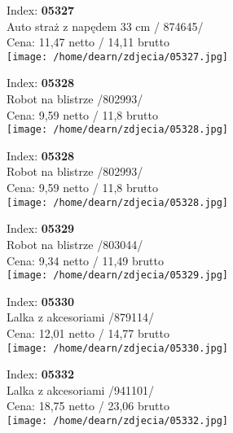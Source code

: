 {Index: \textbf{05327}\\
Auto straż z napędem 33 cm / 874645/\\
Cena: 11,47 netto / 14,11 brutto\\
  \texttt{[image: /home/dearn/zdjecia/05327.jpg]}}\newline\newline

{Index: \textbf{05328}\\
Robot na blistrze /802993/\\
Cena: 9,59 netto / 11,8 brutto\\
  \texttt{[image: /home/dearn/zdjecia/05328.jpg]}}\newline\newline

{Index: \textbf{05328}\\
Robot na blistrze /802993/\\
Cena: 9,59 netto / 11,8 brutto\\
  \texttt{[image: /home/dearn/zdjecia/05328.jpg]}}\newline\newline

{Index: \textbf{05329}\\
Robot na blistrze /803044/\\
Cena: 9,34 netto / 11,49 brutto\\
  \texttt{[image: /home/dearn/zdjecia/05329.jpg]}}\newline\newline

{Index: \textbf{05330}\\
Lalka z akcesoriami /879114/\\
Cena: 12,01 netto / 14,77 brutto\\
  \texttt{[image: /home/dearn/zdjecia/05330.jpg]}}\newline\newline

{Index: \textbf{05332}\\
Lalka z akcesoriami /941101/\\
Cena: 18,75 netto / 23,06 brutto\\
  \texttt{[image: /home/dearn/zdjecia/05332.jpg]}}\newline\newline

